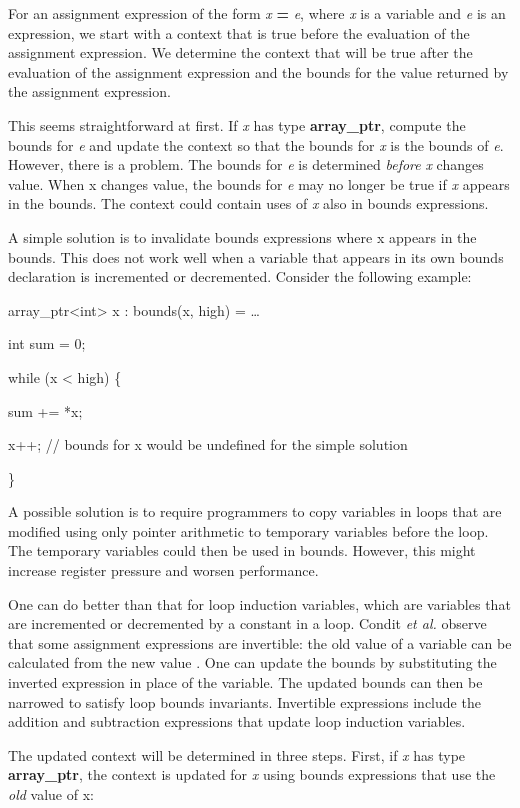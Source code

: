 \documentclass[]{article}
\begin{document}
For an assignment expression of the form \emph{x} \textbf{=} \emph{e},
where \emph{x} is a variable and \emph{e} is an expression, we start
with a context that is true before the evaluation of the assignment
expression. We determine the context that will be true after the
evaluation of the assignment expression and the bounds for the value
returned by the assignment expression.

This seems straightforward at first. If \emph{x} has type
\textbf{array\_ptr}, compute the bounds for \emph{e} and update the
context so that the bounds for \emph{x} is the bounds of \emph{e}.
However, there is a problem. The bounds for \emph{e} is determined
\emph{before} \emph{x} changes value. When x changes value, the bounds
for \emph{e} may no longer be true if \emph{x} appears in the bounds.
The context could contain uses of \emph{x} also in bounds expressions.

A simple solution is to invalidate bounds expressions where x appears in
the bounds. This does not work well when a variable that appears in its
own bounds declaration is incremented or decremented. Consider the
following example:

array\_ptr\textless{}int\textgreater{} x : bounds(x, high) = \ldots{}

int sum = 0;

while (x \textless{} high) \{

sum += *x;

x++; // bounds for x would be undefined for the simple solution

\}

A possible solution is to require programmers to copy variables in loops
that are modified using only pointer arithmetic to temporary variables
before the loop. The temporary variables could then be used in bounds.
However, this might increase register pressure and worsen performance.

One can do better than that for loop induction variables, which are
variables that are incremented or decremented by a constant in a loop.
Condit \emph{et al.} observe that some assignment expressions are
invertible: the old value of a variable can be calculated from the new
value . One can update the bounds by substituting the inverted
expression in place of the variable. The updated bounds can then be
narrowed to satisfy loop bounds invariants. Invertible expressions
include the addition and subtraction expressions that update loop
induction variables.

The updated context will be determined in three steps. First, if
\emph{x} has type \textbf{array\_ptr}, the context is updated for
\emph{x} using bounds expressions that use the \emph{old} value of x:
\end{document}
